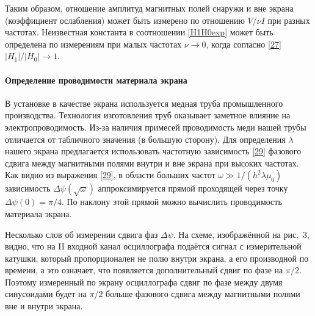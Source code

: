 Таким образом, отношение амплитуд магнитных полей снаружи и вне экрана
(коэффициент ослабления) может быть измерено
по отношению $V/\nu I$ при разных частотах. Неизвестная константа
в соотношении \eqref{H1H0exp} может быть определена по измерениям 
при малых частотах $\nu \to 0$, когда согласно \eqref{27} $|H_1|/|H_0| \to 1$.


\paragraph{Определение проводимости материала экрана}

В установке в качестве экрана используется медная труба промышленного производства. 
Технология изготовления труб оказывает заметное влияние на электропроводимость. 
Из-за наличия примесей проводимость меди нашей трубы отличается 
от табличного значения (в большую сторону). 
Для определения $\lambda$ нашего экрана предлагается использовать частотную 
зависимость \eqref{29} фазового сдвига между магнитными полями внутри и вне экрана 
при высоких частотах. Как видно из выражения \eqref{29}, 
в области больших частот $\omega \gg 1/(h^2\lambda\mu_0)$ зависимость 
$\Delta\psi(\sqrt{\omega})$ аппроксимируется прямой проходящей 
через точку $\Delta\psi(0)=\pi/4$. 
По наклону этой прямой можно вычислить проводимость материала экрана.

Несколько слов об измерении сдвига фаз $\Delta\psi$. На схеме, 
изображённой на рис.~3, видно, что на II входной канал
осциллографа подаётся сигнал с измерительной катушки, который пропорционален 
не полю внутри экрана, а его производной по времени, а это означает, 
что появляется дополнительный сдвиг по фазе на $\pi/2$. Поэтому измеренный 
по экрану осциллографа сдвиг по фазе между двумя синусоидами будет 
на $\pi/2$ больше фазового сдвига между магнитными полями вне и
внутри экрана.

